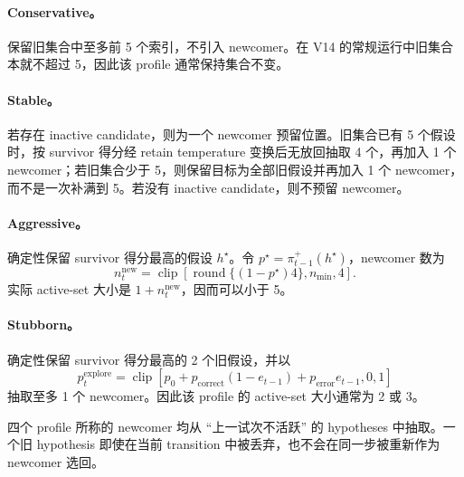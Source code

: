 \paragraph{Conservative。}
保留旧集合中至多前 5 个索引，不引入 newcomer。在 V14 的常规运行中旧集合本就不超过 5，因此该 profile 通常保持集合不变。

\paragraph{Stable。}
若存在 inactive candidate，则为一个 newcomer 预留位置。旧集合已有 5 个假设时，按 survivor 得分经 retain temperature 变换后无放回抽取 4 个，再加入 1 个 newcomer；若旧集合少于 5，则保留目标为全部旧假设并再加入 1 个 newcomer，而不是一次补满到 5。若没有 inactive candidate，则不预留 newcomer。

\paragraph{Aggressive。}
确定性保留 survivor 得分最高的假设 $h^\star$。令 $p^\star=\pi_{t-1}^{+}(h^\star)$，newcomer 数为
\begin{equation}
    n_t^{\mathrm{new}}
    =
    \operatorname{clip}
    \left[
        \operatorname{round}\{(1-p^\star)4\},
        n_{\min},4
    \right].
    \label{eq:modelv14-aggressive-count}
\end{equation}
实际 active-set 大小是 $1+n_t^{\mathrm{new}}$，因而可以小于 5。

\paragraph{Stubborn。}
确定性保留 survivor 得分最高的 2 个旧假设，并以
\begin{equation}
    p_t^{\mathrm{explore}}
    =
    \operatorname{clip}
    \left[
        p_0
        +
        p_{\mathrm{correct}}(1-e_{t-1})
        +
        p_{\mathrm{error}}e_{t-1},
        0,1
    \right]
    \label{eq:modelv14-stubborn-explore}
\end{equation}
抽取至多 1 个 newcomer。因此该 profile 的 active-set 大小通常为 2 或 3。

四个 profile 所称的 newcomer 均从 ``上一试次不活跃'' 的 hypotheses 中抽取。一个旧 hypothesis 即使在当前 transition 中被丢弃，也不会在同一步被重新作为 newcomer 选回。

